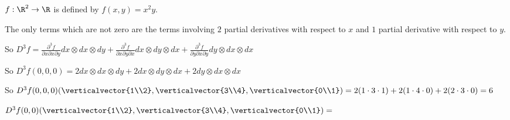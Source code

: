 \documentclass{ximera}
\begin{document}
\begin{question}
  $f:\R^2 \to \R$ is defined by $f(x,y) = x^2y$.  
  \begin{solution}
    \begin{hint}
      The only terms which are not zero are the terms involving $2$ partial derivatives with respect to $x$ and $1$ partial derivative with respect to $y$.
    \end{hint}
    \begin{hint}
      So $D^3f = \frac{\partial ^3 f}{\partial x \partial x \partial y} dx \otimes dx \otimes dy+ \frac{\partial ^3 f}{\partial x \partial y \partial x} dx \otimes dy \otimes dx+ \frac{\partial ^3 f}{\partial y \partial x \partial y} dy \otimes dx \otimes dx$
    \end{hint}
    \begin{hint}
      So $D^3f(0,0,0) = 2 dx\otimes dx \otimes dy+ 2 dx\otimes dy \otimes dx+2 dy\otimes dx \otimes dx$
    \end{hint}
    \begin{hint}
      So $D^3f(0,0,0)(\verticalvector{1\\2},\verticalvector{3\\4},\verticalvector{0\\1}) =2( 1 \cdot 3 \cdot 1)+2( 1 \cdot 4 \cdot 0)+2(2 \cdot 3 \cdot 0) = 6$
    \end{hint}
    $D^3f(0,0)(\verticalvector{1\\2},\verticalvector{3\\4},\verticalvector{0\\1})=$
  \end{solution}
\end{question}
\end{document}
